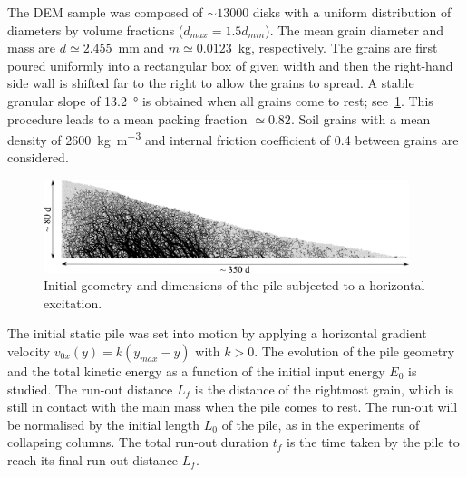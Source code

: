 \documentclass[3p,times,procedia,number]{elsarticle}
\begin{document}
The DEM sample was composed of $\sim13000$ disks with a uniform distribution of 
diameters by volume fractions ($d_{max} = 1.5 d_{min}$). The mean grain 
diameter and mass are $d\simeq 2.455 $~\si{\mm} and $m\simeq 0.0123$~\si{\kg}, 
respectively. The grains are first poured uniformly into a rectangular box of 
given width and then the right-hand side wall is shifted far to the right 
to allow the grains to spread. A stable granular slope of 13.2~\si{\degree} is 
obtained when all grains come to rest; see~\cref{fig:slope_configuration}. This 
procedure leads to a mean packing fraction $\simeq 0.82$. Soil grains with a 
mean density of 2600~\si{\kg\per\m\cubed} and internal friction coefficient of 
0.4 between grains are considered.

\begin{figure}[tbhp]
  \includegraphics[width=0.95\textwidth]{figs/slope_configuration}
  \caption{Initial geometry and dimensions of the pile subjected to a horizontal 
  excitation.}
  \label{fig:slope_configuration}
\end{figure}


The initial static pile was set into motion by applying a horizontal
gradient velocity $v_{0x}(y) = k (y_{max} - y)$ with $k>0$. The evolution of 
the pile geometry and the total kinetic energy as a function of the initial 
input energy $E_0$ is studied. The run-out distance $L_f$ is the distance of 
the rightmost grain, which is still in contact with the main mass when the pile 
comes to rest. The run-out will be normalised by the initial length $L_0$ of 
the pile, as in the experiments of collapsing columns. The total run-out 
duration $t_f$ is the time taken by the pile to reach its final run-out 
distance $L_f$.
\end{document}

